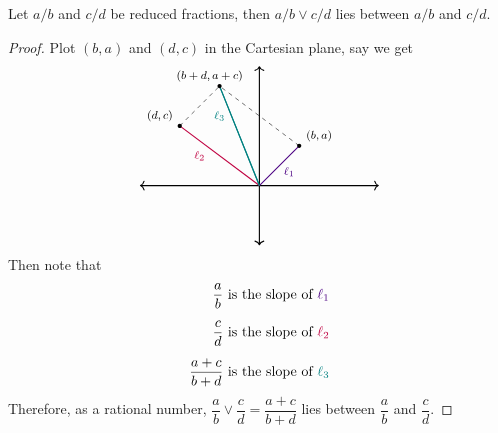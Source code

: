 \begin{proposition}
Let $a/b$ and $c/d$ be reduced fractions, then $a/b \vee c/d$ lies between $a/b$ and $c/d$.
\end{proposition}
\begin{proof}
Plot $(b,a)$ and $(d,c)$ in the Cartesian plane, say we get
\[\begin{tikzpicture}
    \draw[<->,thick] (-3,0)--(3,0);
	\draw[<->,thick] (0,-1.5)--(0,3);
	\draw[-,thick,color=indigo] (0,0)--(1,1);
	\draw[-,thick,color=purple] (0,0)--(-2,1.5);
	\draw[-,thick,color=teal] (0,0)--(-1,2.5);
	\draw[-,thick,color=teal] (0,0)--(-1,2.5);
	\draw[-,dashed] (-2,1.5)--(-1,2.5);	
	\draw[-,dashed] (1,1)--(-1,2.5);	
	\fill (-2,1.5) circle (1.5pt);
    \fill (1,1) circle (1.5pt);
    \fill (-1,2.5) circle (1.5pt);
    \node[] at (1.5,1.25) {\footnotesize $(b,a)$};
    \node[] at (-2.5,1.75) {\footnotesize $(d,c)$};
    \node[] at (-1.25,2.75) {\footnotesize $(b+d,a+c)$};
    \node[color=teal] at (-1,1.75) {\footnotesize $\ell_3$};
    \node[color=purple] at (-1.5,0.75) {\footnotesize $\ell_2$};
    \node[color=indigo] at (0.75,0.35) {\footnotesize $\ell_1$};
\end{tikzpicture}\]
Then note that
\begin{align*}
\frac{a}{b} &\text{ is the slope of {\color{indigo} $\ell_1$}}\\[0.5em]
\frac{c}{d} &\text{ is the slope of {\color{purple} $\ell_2$}}\\[0.5em]
\frac{a+c}{b+d} &\text{ is the slope of {\color{teal} $\ell_3$}}
\end{align*}
Therefore, as a rational number, $\dfrac{a}{b}\vee \dfrac{c}{d} = \dfrac{a+c}{b+d}$ lies between $\dfrac{a}{b}$ and $\dfrac{c}{d}$.
\end{proof}

\vspace*{1em}

